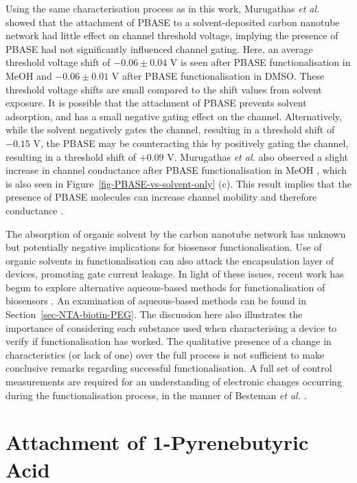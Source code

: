 \documentclass[
  a4paper,
]{scrbook}
\begin{document}
Using the same characterisation process as in this work, Murugathas
\emph{et al.} \autocite{Murugathas2019a} showed that the attachment of
PBASE to a solvent-deposited carbon nanotube network had little effect
on channel threshold voltage, implying the presence of PBASE had not
significantly influenced channel gating. Here, an average threshold
voltage shift of \(-0.06 \pm 0.04\) V is seen after PBASE
functionalisation in MeOH and \(-0.06 \pm 0.01\) V after PBASE
functionalisation in DMSO. These threshold voltage shifts are small
compared to the shift values from solvent exposure. It is possible that
the attachment of PBASE prevents solvent adsorption, and has a small
negative gating effect on the channel. Alternatively, while the solvent
negatively gates the channel, resulting in a threshold shift of
\(-0.15\) V, the PBASE may be counteracting this by positively gating
the channel, resulting in a threshold shift of \(+0.09\) V. Murugathas
\emph{et al.} also observed a slight increase in channel conductance
after PBASE functionalisation in MeOH \autocite{Murugathas2019a}, which
is also seen in Figure~\ref{fig-PBASE-vs-solvent-only} (c). This result
implies that the presence of PBASE molecules can increase channel
mobility and therefore conductance \autocite{Heller2008}.

The absorption of organic solvent by the carbon nanotube network has
unknown but potentially negative implications for biosensor
functionalisation. Use of organic solvents in functionalisation can also
attack the encapsulation layer of devices, promoting gate current
leakage. In light of these issues, recent work has begun to explore
alternative aqueous-based methods for functionalisation of biosensors
\autocite{Khan2021}. An examination of aqueous-based methods can be
found in Section~\ref{sec-NTA-biotin-PEG}. The discussion here also
illustrates the importance of considering each substance used when
characterising a device to verify if functionalisation has worked. The
qualitative presence of a change in characteristics (or lack of one)
over the full process is not sufficient to make conclusive remarks
regarding successful functionalisation. A full set of control
measurements are required for an understanding of electronic changes
occurring during the functionalisation process, in the manner of
Besteman \emph{et al.} \autocite{Besteman2003}.

\hypertarget{sec-PBA}{%
\section{Attachment of 1-Pyrenebutyric Acid}\label{sec-PBA}}
\end{document}
